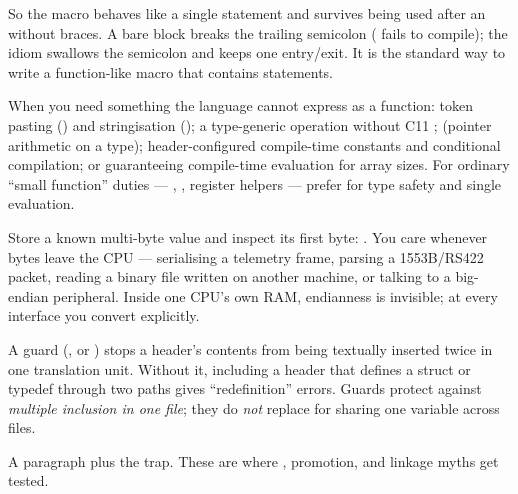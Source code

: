 So the macro behaves like a single statement and survives being used after an
 without braces. A bare  block breaks the trailing
semicolon ( fails to compile); the
 idiom swallows the semicolon and keeps one entry/exit.
It is the standard way to write a function-like macro that contains
statements.

When you need something the language cannot express as a function: token
pasting (\code{\#\#}) and stringisation (\code{\#}); a type-generic operation
without C11 ;  (pointer arithmetic on a
type); header-configured compile-time constants and conditional compilation;
or guaranteeing compile-time evaluation for array sizes. For ordinary
``small function'' duties --- , , register helpers ---
prefer  for type safety and single evaluation.

Store a known multi-byte value and inspect its first byte:
. You care
whenever bytes leave the CPU --- serialising a telemetry frame, parsing a
1553B/RS422 packet, reading a binary file written on another machine, or
talking to a big-endian peripheral. Inside one CPU's own RAM, endianness is
invisible; at every interface you convert explicitly.

A guard (, or
) stops a header's contents from being textually inserted
twice in one translation unit. Without it, including a header that defines a
struct or typedef through two paths gives ``redefinition'' errors. Guards
protect against \emph{multiple inclusion in one file}; they do \emph{not}
replace  for sharing one variable across files.

%
{A paragraph plus the trap. These are where , promotion, and
linkage myths get tested.}

